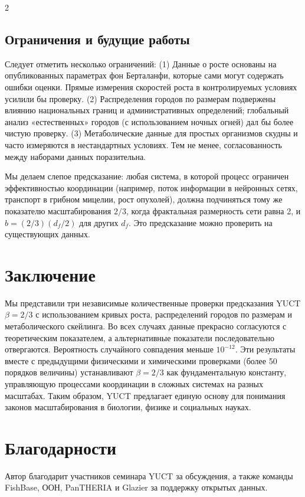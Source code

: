 \documentclass[11pt,a4paper]{article}
\newcommand{\df}{d_f}
\begin{document}
\begin{multicols}{2}
		\subsection{Ограничения и будущие работы}
		
		Следует отметить несколько ограничений: (1) Данные о росте основаны на опубликованных параметрах фон Берталанфи, которые сами могут содержать ошибки оценки. Прямые измерения скоростей роста в контролируемых условиях усилили бы проверку. (2) Распределения городов по размерам подвержены влиянию национальных границ и административных определений; глобальный анализ «естественных» городов (с использованием ночных огней) дал бы более чистую проверку. (3) Метаболические данные для простых организмов скудны и часто измеряются в нестандартных условиях. Тем не менее, согласованность между наборами данных поразительна.
		
		Мы делаем слепое предсказание: любая система, в которой процесс ограничен эффективностью координации (например, поток информации в нейронных сетях, транспорт в грибном мицелии, рост опухолей), должна подчиняться тому же показателю масштабирования \(2/3\), когда фрактальная размерность сети равна 2, и \(b = (2/3)(\df/2)\) для других \(\df\). Это предсказание можно проверить на существующих данных.
		
		\section{Заключение}
		
		Мы представили три независимые количественные проверки предсказания YUCT \(\beta = 2/3\) с использованием кривых роста, распределений городов по размерам и метаболического скейлинга. Во всех случаях данные прекрасно согласуются с теоретическим показателем, а альтернативные показатели последовательно отвергаются. Вероятность случайного совпадения меньше \(10^{-12}\). Эти результаты вместе с предыдущими физическими и химическими проверками (более 50 порядков величины) устанавливают \(\beta = 2/3\) как фундаментальную константу, управляющую процессами координации в сложных системах на разных масштабах. Таким образом, YUCT предлагает единую основу для понимания законов масштабирования в биологии, физике и социальных науках.
		
		\section*{Благодарности}
		
		Автор благодарит участников семинара YUCT за обсуждения, а также команды FishBase, ООН, PanTHERIA и Glazier за поддержку открытых данных.
		

\end{multicols}
\end{document}
